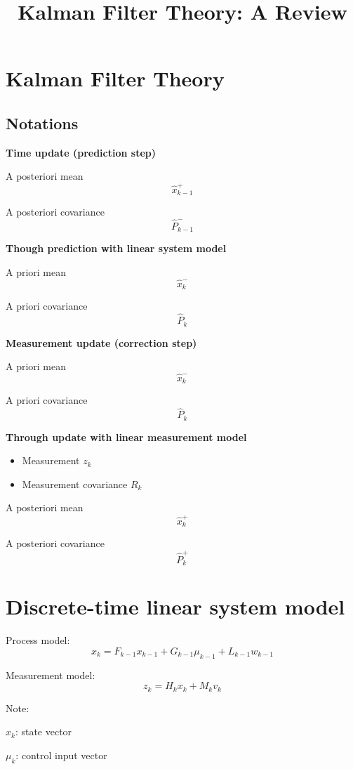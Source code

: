 \documentclass[11pt]{article}
\title{Kalman Filter Theory: A Review}
\begin{document}
\maketitle

\section{Kalman Filter Theory}

\subsection{Notations}

\textbf{Time update (prediction step)}

A posteriori mean \[ \hat{x}^+_{k-1} \]

A posteriori covariance \[ \hat{P}^{-}_{k-1} \]

\textbf{Though prediction with linear system model}

A priori mean \[ \hat{x}^-_{k} \]

A priori covariance \[ \hat{P}_{k} \]

\textbf{Measurement update (correction step)}

A priori mean \[ \hat{x}^-_{k} \]

A priori covariance \[ \hat{P}_{k} \]

\textbf{Through update with linear measurement model}

\begin{itemize}
    \item Measurement $z_k$
    \item Measurement covariance $R_k$
\end{itemize}

A posteriori mean \[ \hat{x}^+_{k} \]

A posteriori covariance \[ \hat{P}^{+}_{k} \]


\section{Discrete-time linear system model}

Process model:
\[ x_k = F_{k-1} x_{k-1} + G_{k-1} \mu_{k-1} + L_{k-1} w_{k-1} \]

Measurement model:
\[ z_k = H_k x_k + M_k v_k \] 


Note:

$x_k$: state vector 

$\mu_k$: control input vector
\end{document}
